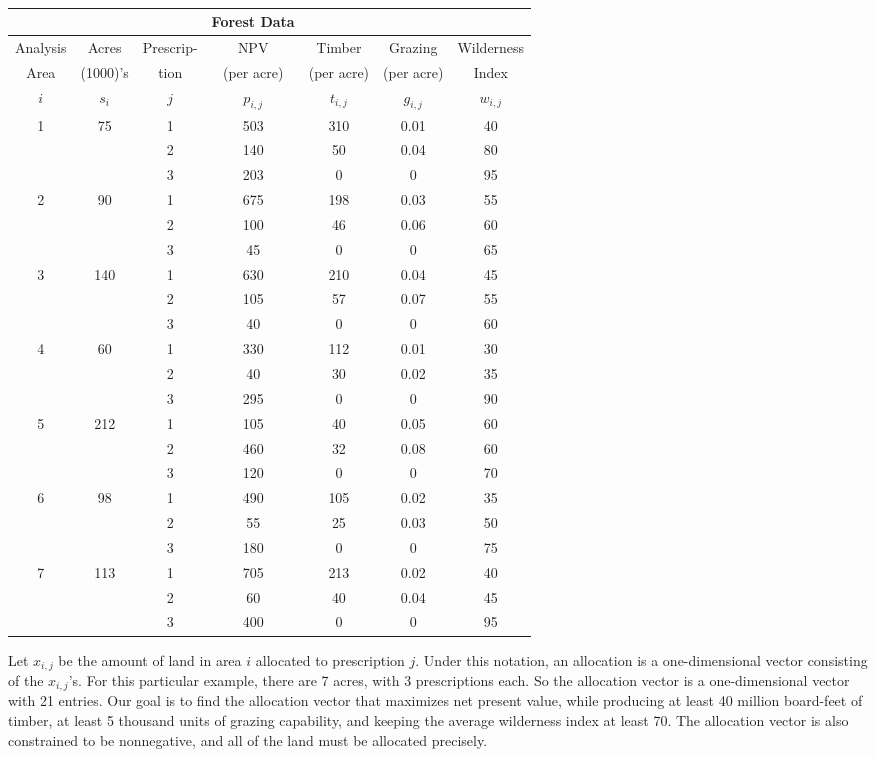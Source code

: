 \begin{table}[H]
\centering
    \begin{tabular}{c c c c c c c}
&&&Forest Data&&& \\
\hline
Analysis & Acres &Prescrip-&NPV&Timber&Grazing&Wilderness \\
Area&(1000)'s &tion&(per acre) &(per acre)&(per acre)& Index\\
$i$ &$s_i$&$j$& $p_{i,j}$ & $t_{i,j}$&$g_{i,j}$&$w_{i,j}$ \\\hline
1&	75	&1	&503	&310	&0.01&	40\\
&&		2&	140&	50&	0.04	&80\\
&&		3&	203&	0&	0&	95\\ \hline
2&	90&	1	&675&	198&	0.03&	55\\
&&		2&	100&	46&	0.06&	60\\
&&		3&	45&	0&	0&	65\\ \hline
3&	140&	1	&630&	210	&0.04&	45\\
&&		2&	105&	57&	0.07&	55\\
&&		3&	40	&0&	0&	60\\ \hline
4	&60&	1&	330&	112&	0.01&	30\\
&&		2	&40&	30&	0.02&	35\\
&&		3&	295&	0&	0	&90\\ \hline
5	&212&	1	&105	&40	&0.05&	60\\
&&		2	&460&	32	&0.08&	60\\
&& 3	&120&0&	0	&70\\ \hline
6	&98	&1	&490	&105	&0.02	&35\\
&&		2&	55	&25	&0.03	&50\\
&&		3	&180	&0	&0	&75\\ \hline
7&	113&	1	&705	&213&	0.02	&40\\
&&		2&	60	&40	&0.04&	45\\
&&		3	&400	&0	&0	&95\\
\hline
    \end{tabular}
\caption{}
\label{tab:forest}
\end{table}
Let $x_{i,j}$ be the amount of land in area $i$ allocated to prescription $j$.
Under this notation, an allocation is a one-dimensional vector consisting of the $x_{i,j}$'s. 
For this particular
example, there are 7 acres, with 3 prescriptions each.
So the allocation vector is a one-dimensional vector with 21 entries.
Our goal is to find the allocation vector that maximizes net present value, while producing at least 40 million
board-feet of timber, at least 5 thousand units of grazing capability, and keeping the average wilderness index at least 70.
The allocation vector is also constrained to be nonnegative, and all of the land must be allocated precisely.

